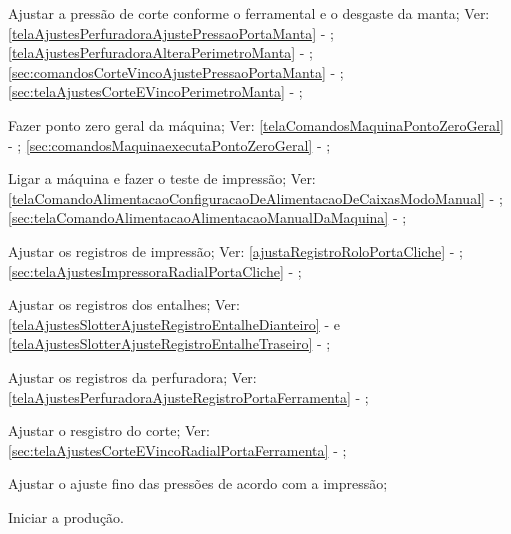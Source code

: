 \begin{procedureAdjustmentNoRecipe}
  \fi
  \item[\ding{\dingNumber}] Ajustar a pressão de corte conforme o ferramental e o desgaste da manta; Ver: 
  \ifmachineType
  \ref{telaAjustesPerfuradoraAjustePressaoPortaManta} - ;
  \ref{telaAjustesPerfuradoraAlteraPerimetroManta} - ;
  \else
  \ref{sec:comandosCorteVincoAjustePressaoPortaManta} - ;
  \ref{sec:telaAjustesCorteEVincoPerimetroManta} - ;
  \fi
  \item[\ding{\dingNumber}] Fazer ponto zero geral da máquina; Ver: 
  \ifmachineType
  \ref{telaComandosMaquinaPontoZeroGeral} - ;
  \else
  \ref{sec:comandosMaquinaexecutaPontoZeroGeral} - ;
  \fi
  \item[\ding{\dingNumber}] Ligar a máquina e fazer o teste de impressão; Ver: 
  \ifmachineType
  \ref{telaComandoAlimentacaoConfiguracaoDeAlimentacaoDeCaixasModoManual} - ;
  \else
  \ref{sec:telaComandoAlimentacaoAlimentacaoManualDaMaquina} - ;
  \fi
  \item[\ding{\dingNumber}] Ajustar os registros de impressão; Ver: 
  \ifmachineType
  \ref{ajustaRegistroRoloPortaCliche} - ;
  \else
  \ref{sec:telaAjustesImpressoraRadialPortaCliche} - ;
  \fi
  \ifmachineType
  \item[\ding{\dingNumber}] Ajustar os registros dos entalhes; Ver: \ref{telaAjustesSlotterAjusteRegistroEntalheDianteiro} -  e \ref{telaAjustesSlotterAjusteRegistroEntalheTraseiro} - ;
  \item[\ding{\dingNumber}] Ajustar os registros da perfuradora; Ver: \ref{telaAjustesPerfuradoraAjusteRegistroPortaFerramenta} - ;
  \else
  \item[\ding{\dingNumber}] Ajustar o resgistro do corte; Ver: \ref{sec:telaAjustesCorteEVincoRadialPortaFerramenta} - ;
  \fi
  \item[\ding{\dingNumber}] Ajustar o ajuste fino das pressões de acordo com a impressão;
  \item[\ding{\dingNumber}] Iniciar a produção.
  
\end{procedureAdjustmentNoRecipe}

